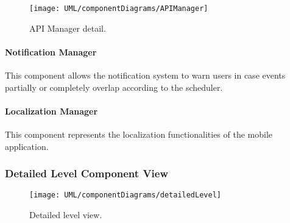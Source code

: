 		\begin{figure}[H]
			\centering
			\texttt{[image: UML/componentDiagrams/APIManager]}
			\caption{API Manager detail.}
			\label{APIManagerDetail}
		\end{figure}
	
	
	\paragraph{Notification Manager}
		This component allows the notification system to warn users in case events partially or completely overlap according to the scheduler.

	\paragraph{Localization Manager}
		This component represents the localization functionalities of the mobile application.


\subsubsection{Detailed Level Component View}

	\begin{landscape}
		\begin{figure}
			\texttt{[image: UML/componentDiagrams/detailedLevel]}
			\centering
			\caption{Detailed level view.}
			\label{detailedHighLevel}
		\end{figure}
	\end{landscape}
